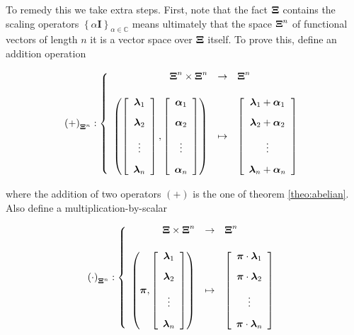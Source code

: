 	To remedy this we take extra steps. First, note that the fact $\boldsymbol{\Xi}$ contains the scaling operators $\left\{\alpha\mathbf{I}\right\}_{\alpha\in\mathbb{C}}$ means ultimately that the space $\boldsymbol{\Xi}^n$ of functional vectors of length $n$ it is a vector space over $\boldsymbol{\Xi}$ itself. To prove this, define an addition operation

\begin{equation} \left(+\right)_{\boldsymbol{\Xi}^n}: \left\{\begin{array}{rcl} \boldsymbol{\Xi}^n\times\boldsymbol{\Xi}^n &\to& \boldsymbol{\Xi}^n \\[5mm] \left(\left[\begin{array}{c} \boldsymbol{\lambda}_1 \\[3mm] \boldsymbol{\lambda}_2 \\[3mm] \vdots \\[3mm] \boldsymbol{\lambda}_n \end{array}\right],\left[\begin{array}{c} \boldsymbol{\alpha}_1 \\[3mm] \boldsymbol{\alpha}_2 \\[3mm] \vdots \\[3mm] \boldsymbol{\alpha}_n \end{array}\right]\right) &\mapsto& \left[\begin{array}{c} \boldsymbol{\lambda}_1 + \boldsymbol{\alpha}_1 \\[3mm] \boldsymbol{\lambda}_2 + \boldsymbol{\alpha}_2 \\[3mm] \vdots \\[3mm] \boldsymbol{\lambda}_n + \boldsymbol{\alpha}_n \end{array}\right] \end{array}\right. \end{equation}

	\noindent where the addition of two operators $(+)$ is the one of theorem \ref{theo:abelian}. Also define a multiplication-by-scalar

\begin{equation} \left(\cdot\right)_{\boldsymbol{\Xi}^n}: \left\{\begin{array}{rcl} \boldsymbol{\Xi}\times\boldsymbol{\Xi}^n &\to& \boldsymbol{\Xi}^n \\[5mm] \left(\boldsymbol{\pi},\left[\begin{array}{c} \boldsymbol{\lambda}_1 \\[3mm] \boldsymbol{\lambda}_2 \\[3mm] \vdots \\[3mm] \boldsymbol{\lambda}_n \end{array}\right]\right) &\mapsto& \left[\begin{array}{c} \boldsymbol{\pi}\cdot\boldsymbol{\lambda}_1 \\[3mm] \boldsymbol{\pi}\cdot\boldsymbol{\lambda}_2 \\[3mm] \vdots \\[3mm] \boldsymbol{\pi}\cdot\boldsymbol{\lambda}_n \end{array}\right] \end{array}\right. \end{equation}


